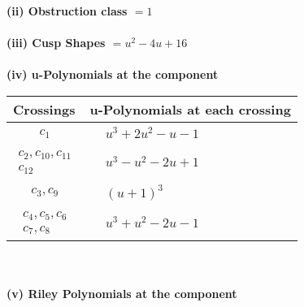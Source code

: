 \documentclass[1p]{elsarticle_modified}
\theoremstyle{definition}
\begin{document}
\flushleft \textbf{(ii) Obstruction class $= 1$}\\~\\
\flushleft \textbf{(iii) Cusp Shapes $= u^2-4 u+16$}\\~\\
\newpage\renewcommand{\arraystretch}{1}
\flushleft \textbf{(iv) u-Polynomials at the component}\newline \\
\begin{tabular}{m{50pt}|m{274pt}}
Crossings & \hspace{64pt}u-Polynomials at each crossing \\
\hline $$\begin{aligned}c_{1}\end{aligned}$$&$\begin{aligned}
&u^3+2 u^2- u-1
\end{aligned}$\\
\hline $$\begin{aligned}c_{2},c_{10},c_{11}\\c_{12}\end{aligned}$$&$\begin{aligned}
&u^3- u^2-2 u+1
\end{aligned}$\\
\hline $$\begin{aligned}c_{3},c_{9}\end{aligned}$$&$\begin{aligned}
&(u+1)^3
\end{aligned}$\\
\hline $$\begin{aligned}c_{4},c_{5},c_{6}\\c_{7},c_{8}\end{aligned}$$&$\begin{aligned}
&u^3+u^2-2 u-1
\end{aligned}$\\
\hline
\end{tabular}\\~\\
\newpage\renewcommand{\arraystretch}{1}
\flushleft \textbf{(v) Riley Polynomials at the component}\newline \\
\end{document}

